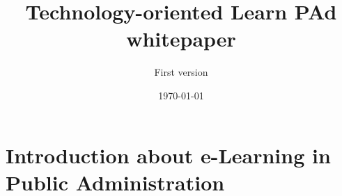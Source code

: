 \documentclass{learnpad}
\title{Technology-oriented Learn PAd whitepaper}
\subtitle{First version}
\date{\today}
\begin{document}
\frontmatter
\maketitle

\begin{history}
\end{history}

\reviewtable


\tableofcontents




\mainmatter


\chapter{Introduction about e-Learning in Public Administration}
\label{ch:intro}
\end{document}

